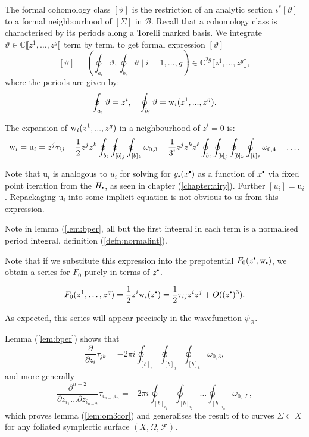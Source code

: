     The formal cohomology class \([\vartheta]\) is the restriction of an analytic section \( \iota^* [ \vartheta]\) to a formal neighbourhood of \([\Sigma] \) in \( \mathcal{B}\). Recall that a cohomology class is characterised by its periods along a Torelli marked basis. We integrate \( \vartheta \in \mathbb{C}\lBrack z^1, \dots, z^g \rBrack \) term by term, to get formal expression \([\vartheta]\)
    \[[\vartheta]= \left( \oint_{a_i}\vartheta, \oint_{b_i}\vartheta \mid i=1,\dots,g\right) \in \mathbb{C}^{2g}\lBrack z^1, \dots, z^g \rBrack,\]
    where the periods are given by:
    \[\oint_{a_i}\vartheta=z^i,\quad\oint_{b_i}\vartheta= \mathrm{w}_i(z^1,...,z^g). \]
    \begin{lem}  
        \label{lem:bper}
        The expansion of \(\mathrm{w}_i(z^1,...,z^g)\) in a neighbourhood of \(z^i=0\) is:
        \begin{equation}   \label{bperi}   
            \mathrm{w}_i = \mathrm{u}_i = z^j\tau_{ij}-\frac12z^jz^k\oint_{b_i}\oint_{[b]_j}\oint_{[b]_k}\omega_{0,3}-\frac{1}{3!}z^jz^kz^\ell\oint_{b_i}\oint_{[b]_j}\oint_{[b]_k}\oint_{[b]_\ell}\omega_{0,4}-\dots .
        \end{equation}
    \end{lem}
    \begin{rem} Note that \( \mathrm{u}_i \) is analogous to \( u_i\) for solving for \(y_{\sbt}(x^{\sbt})\) as a function of \(x^{\sbt}\) via fixed point iteration from the \(H_{\sbt}\), as seen in chapter (\ref{chapter:airy}). Further \( [u_i] = \mathrm{u}_i\). Repackaging \( \mathrm{u}_i\) into some implicit equation is not obvious to us from this expression. 
    \end{rem}
    Note in lemma (\ref{lem:bper}, all but the first integral in each term is a normalised period integral, definition (\ref{defn:normalint}).
    
    Note that if we substitute this expression into the prepotential \( 
    F_0(z^{\sbt},\w_{\sbt})\), we obtain a series for \(F_0\) purely in terms of \(z^{\sbt}\).
    \begin{lem}
    \begin{equation} 
    \label{eqn:prepotential}
     F_0(z^1, \dots, z^g) = \frac{1}{2} z^i \w_i(z^{\sbt})= \frac{1}{2} \tau_{ij} z^i z^j + O((z^{\sbt})^3).
    \end{equation}
    \end{lem}
    As expected, this series will appear precisely in the wavefunction \( \psi_{\mathcal{B}}\).
    
    
    Lemma (\ref{lem:bper}) shows that
    \[\frac{\partial}{\partial z_i}\tau_{jk}=-2\pi i\oint_{[b]_i}\oint_{[b]_j}\oint_{[b]_k}\omega_{0,3},\]
    and more generally 
    \[\frac{\partial^{n-2}}{\partial z_{i_1} \dots \partial z_{i_{n-2}}}\tau_{i_{n-1}i_n}=-2\pi i\oint_{[b]_{i_1}}\oint_{[b]_{i_2}} \dots \oint_{[b]_{i_n}}\omega_{0,|I|},\] 
    which proves lemma (\ref{lem:om3cor}) and generalises the result of \cite{bhuespe} to curves \(\Sigma\subset X \) for any foliated symplectic surface \((X,\Omega,\mathcal{F})\).
    
